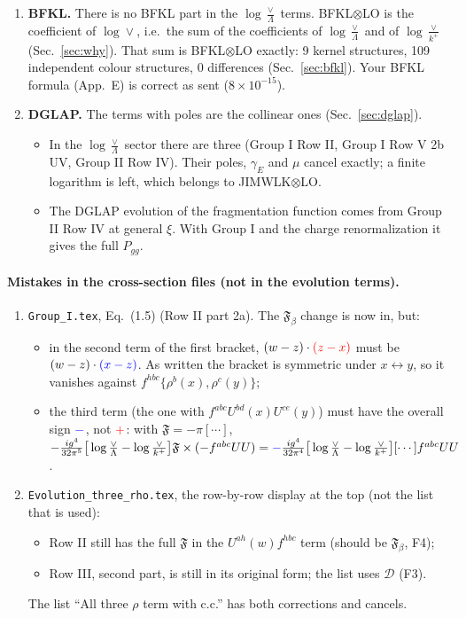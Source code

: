 \documentclass[10pt]{article}
\numberwithin{equation}{section}
\newcommand{\new}[1]{{\color{blue}#1}}
\newcommand{\old}[1]{{\color{red}#1}}
\begin{document}
\begin{enumerate}
\item \textbf{BFKL.} There is no BFKL part in the $\log\frac{\vee}{\Lambda}$ terms. BFKL$\otimes$LO is the coefficient of $\log\vee$, i.e.\ the sum of the coefficients of $\log\frac{\vee}{\Lambda}$ and of $\log\frac{\vee}{k^+}$ (Sec.~\ref{sec:why}). That sum is BFKL$\otimes$LO exactly: 9 kernel structures, 109 independent colour structures, 0 differences (Sec.~\ref{sec:bfkl}). Your BFKL formula (App.~E) is correct as sent ($8\times10^{-15}$).
\item \textbf{DGLAP.} The terms with poles are the collinear ones (Sec.~\ref{sec:dglap}).
\begin{itemize}
\item In the $\log\frac{\vee}{\Lambda}$ sector there are three (Group I Row II, Group I Row V 2b UV, Group II Row IV). Their poles, $\gamma_E$ and $\mu$ cancel exactly; a finite logarithm is left, which belongs to JIMWLK$\otimes$LO.
\item The DGLAP evolution of the fragmentation function comes from Group II Row IV at general $\xi$. With Group I and the charge renormalization it gives the full $P_{gg}$.
\end{itemize}
\end{enumerate}

\paragraph{Mistakes in the cross-section files (not in the evolution terms).}
\begin{enumerate}
\item[\textbf{M3}] \texttt{Group\_I.tex}, Eq.~(1.5) (Row II part 2a). The $\mathfrak F_\beta$ change is now in, but:
\begin{itemize}
\item in the second term of the first bracket, $(w-z)\cdot\old{(z-x)}$ must be $(w-z)\cdot\new{(x-z)}$. As written the bracket is symmetric under $x\leftrightarrow y$, so it vanishes against $f^{hbc}\{\rho^b(x),\rho^c(y)\}$;
\item the third term (the one with $f^{abc}U^{bd}(x)U^{ce}(y)$) must have the overall sign $\new{-}$, not $\old{+}$: with $\mathfrak F=-\pi[\cdots]$, $-\frac{ig^4}{32\pi^5}\big[\log\frac{\vee}{\Lambda}-\log\frac{\vee}{k^+}\big]\mathfrak F\times(-f^{abc}UU)=\new{-}\frac{ig^4}{32\pi^4}\big[\log\frac{\vee}{\Lambda}-\log\frac{\vee}{k^+}\big][\cdots]f^{abc}UU$.
\end{itemize}
\item[\textbf{M4}] \texttt{Evolution\_three\_rho.tex}, the row-by-row display at the top (not the list that is used):
\begin{itemize}
\item Row II still has the full $\mathfrak F$ in the $U^{ah}(w)f^{hbc}$ term (should be $\mathfrak F_\beta$, F4);
\item Row III, second part, is still in its original form; the list uses $\mathcal D$ (F3).
\end{itemize}
The list ``All three $\rho$ term with c.c.'' has both corrections and cancels.
\end{enumerate}
\end{document}
